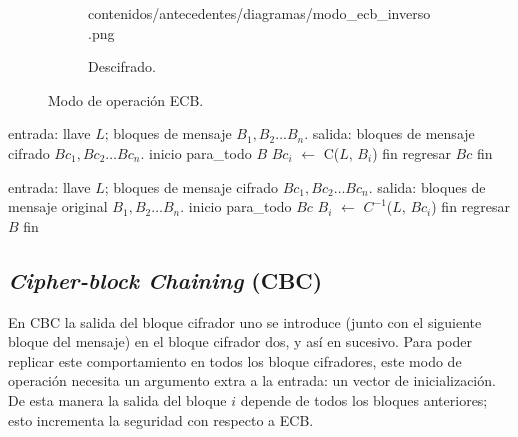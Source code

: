 \begin{figure}[H]
\begin{subfigure}{0.45\textwidth}
\begin{center}
            {contenidos/antecedentes/diagramas/modo_ecb_inverso.png}
          \caption{Descifrado.}
      \end{center}
  \end{subfigure}
  \caption{Modo de operación ECB.}
  \label{figura:ecb}
\end{figure}

\begin{algoritmo}[caption={Modo de operación ECB, cifrado.}]
  entrada: llave $ L $; bloques de mensaje $ B_1, B_2 \dots B_n $.
   salida: bloques de mensaje cifrado $ Bc_1, Bc_2 \dots Bc_n $.
  inicio
    para_todo $B$
      $Bc_i$ $\gets$ C($L$, $B_i$)
    fin
    regresar $Bc$
  fin
\end{algoritmo}

\begin{algoritmo}[caption={Modo de operación ECB, descifrado.}]
  entrada: llave $ L $; bloques de mensaje cifrado $ Bc_1, Bc_2 \dots Bc_n $.
   salida: bloques de mensaje original $ B_1, B_2 \dots B_n $.
  inicio
    para_todo $Bc$
      $B_i$ $\gets$ $C^{-1}$($L$, $Bc_i$)
    fin
    regresar $B$
  fin
\end{algoritmo}


\subsection{\textit{Cipher-block Chaining} (CBC)}

En CBC la salida del bloque cifrador uno se introduce (junto con el siguiente
bloque del mensaje) en el bloque cifrador dos, y así en sucesivo. Para poder
replicar este comportamiento en todos los bloque cifradores, este modo de
operación necesita un argumento extra a la entrada: un vector de
inicialización. De esta manera la salida del bloque $ i $ depende de todos
los bloques anteriores; esto incrementa la seguridad con respecto a ECB.

\vspace{0.5cm}

